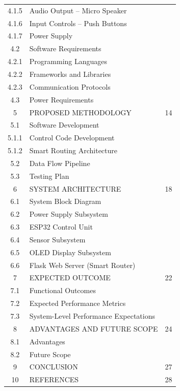 \begin{longtable}{|c|p{9cm}|c|}
4.1.5 & \qquad Audio Output -- Micro Speaker & \\
4.1.6 & \qquad Input Controls -- Push Buttons & \\
4.1.7 & \qquad Power Supply & \\
4.2 & \quad Software Requirements & \\
4.2.1 & \qquad Programming Languages & \\
4.2.2 & \qquad Frameworks and Libraries & \\
4.2.3 & \qquad Communication Protocols & \\
4.3 & \quad Power Requirements & \\
\hline
5 & PROPOSED METHODOLOGY & 14 \\
5.1 & \quad Software Development & \\
5.1.1 & \qquad Control Code Development & \\
5.1.2 & \qquad Smart Routing Architecture & \\
5.2 & \quad Data Flow Pipeline & \\
5.3 & \quad Testing Plan & \\
\hline
6 & SYSTEM ARCHITECTURE & 18 \\
6.1 & \quad System Block Diagram & \\
6.2 & \quad Power Supply Subsystem & \\
6.3 & \quad ESP32 Control Unit & \\
6.4 & \quad Sensor Subsystem & \\
6.5 & \quad OLED Display Subsystem & \\
6.6 & \quad Flask Web Server (Smart Router) & \\
\hline
7 & EXPECTED OUTCOME & 22 \\
7.1 & \quad Functional Outcomes & \\
7.2 & \quad Expected Performance Metrics & \\
7.3 & \quad System-Level Performance Expectations & \\
\hline
8 & ADVANTAGES AND FUTURE SCOPE & 24 \\
8.1 & \quad Advantages & \\
8.2 & \quad Future Scope & \\
\hline
9 & CONCLUSION & 27 \\
\hline
10 & REFERENCES & 28 \\
\hline
\end{longtable}
\newpage
